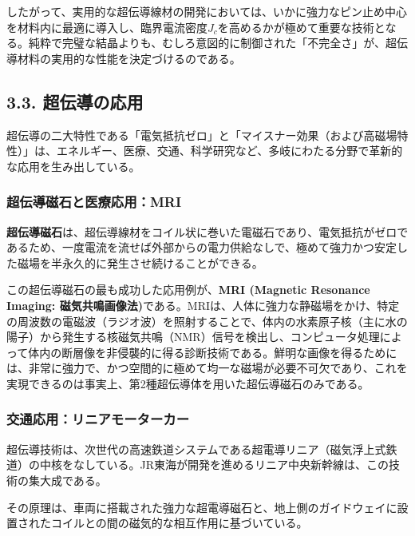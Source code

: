 \documentclass[11pt,a4paper]{ltjsarticle}
\begin{document}
したがって、実用的な超伝導線材の開発においては、いかに強力なピン止め中心を材料内に最適に導入し、臨界電流密度$J_c$を高めるかが極めて重要な技術となる。純粋で完璧な結晶よりも、むしろ意図的に制御された「不完全さ」が、超伝導材料の実用的な性能を決定づけるのである。

\subsection*{3.3. 超伝導の応用}

超伝導の二大特性である「電気抵抗ゼロ」と「マイスナー効果（および高磁場特性）」は、エネルギー、医療、交通、科学研究など、多岐にわたる分野で革新的な応用を生み出している。

\subsubsection*{超伝導磁石と医療応用：MRI}

\textbf{超伝導磁石}は、超伝導線材をコイル状に巻いた電磁石であり、電気抵抗がゼロであるため、一度電流を流せば外部からの電力供給なしで、極めて強力かつ安定した磁場を半永久的に発生させ続けることができる。

この超伝導磁石の最も成功した応用例が、\textbf{MRI (Magnetic Resonance Imaging: 磁気共鳴画像法)}である。MRIは、人体に強力な静磁場をかけ、特定の周波数の電磁波（ラジオ波）を照射することで、体内の水素原子核（主に水の陽子）から発生する核磁気共鳴（NMR）信号を検出し、コンピュータ処理によって体内の断層像を非侵襲的に得る診断技術である。鮮明な画像を得るためには、非常に強力で、かつ空間的に極めて均一な磁場が必要不可欠であり、これを実現できるのは事実上、第2種超伝導体を用いた超伝導磁石のみである。

\subsubsection*{交通応用：リニアモーターカー}

超伝導技術は、次世代の高速鉄道システムである超電導リニア（磁気浮上式鉄道）の中核をなしている。JR東海が開発を進めるリニア中央新幹線は、この技術の集大成である。

その原理は、車両に搭載された強力な超電導磁石と、地上側のガイドウェイに設置されたコイルとの間の磁気的な相互作用に基づいている。
\end{document}
